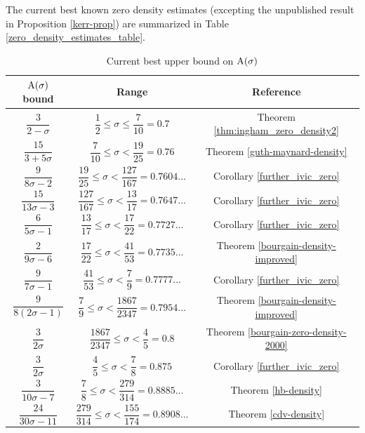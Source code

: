 The current best known zero density estimates (excepting the unpublished result in Proposition \ref{kerr-prop}) are summarized in Table \ref{zero_density_estimates_table}.

\derived
{}

\begin{table}[ht]
    \def\arraystretch{2}
    \centering
    \caption{Current best upper bound on $\mathrm{A}(\sigma)$}
    \begin{tabular}{|c|c|c|}
    \hline
    $\mathrm{A}(\sigma)$ bound & Range & Reference\\
    \hline
    $\dfrac{3}{2 - \sigma}$ & $\dfrac{1}{2} \leq \sigma \le \dfrac{7}{10} = 0.7$ & Theorem \ref{thm:ingham_zero_density2}\\
    \hline
    $\dfrac{15}{3+5\sigma}$ & $\dfrac{7}{10} \leq \sigma < \dfrac{19}{25} = 0.76$ & Theorem \ref{guth-maynard-density}\\
    \hline
    $\dfrac{9}{8\sigma - 2}$ & $\dfrac{19}{25} \leq \sigma < \dfrac{127}{167} = 0.7604\ldots$ & Corollary \ref{further_ivic_zero}\\
    \hline
    $\dfrac{15}{13\sigma - 3}$ & $\dfrac{127}{167} \leq \sigma < \dfrac{13}{17} = 0.7647\ldots$ & Corollary \ref{further_ivic_zero}\\
    \hline
    $\dfrac{6}{5\sigma - 1}$ & $\dfrac{13}{17} \leq \sigma < \dfrac{17}{22} = 0.7727\ldots$ & Corollary \ref{further_ivic_zero}\\
    \hline
    $\dfrac{2}{9\sigma - 6}$ & $\dfrac{17}{22} \leq \sigma < \dfrac{41}{53} = 0.7735\ldots$ & Theorem \ref{bourgain-density-improved}\\
    \hline
    $\dfrac{9}{7\sigma - 1}$ & $\dfrac{41}{53} \leq \sigma < \dfrac{7}{9} = 0.7777\ldots$ & Corollary \ref{further_ivic_zero}\\
    \hline
    $\dfrac{9}{8(2\sigma-1)}$ & $\dfrac{7}{9} \le \sigma < \dfrac{1867}{2347} = 0.7954\ldots$ & Theorem \ref{bourgain-density-improved} \\
    \hline
    $\dfrac{3}{2\sigma}$ & $\dfrac{1867}{2347} \le \sigma < \dfrac{4}{5} = 0.8$ & Theorem \ref{bourgain-zero-density-2000} \\
    \hline
    $\dfrac{3}{2\sigma}$ & $\dfrac{4}{5} \le \sigma < \dfrac{7}{8} = 0.875$ & Corollary \ref{further_ivic_zero} \\
    \hline
    $\dfrac{3}{10\sigma - 7}$ & $\dfrac{7}{8} \le \sigma < \dfrac{279}{314} = 0.8885\ldots$ & Theorem \ref{hb-density}\\
    \hline
    $\dfrac{24}{30\sigma - 11}$ & $\dfrac{279}{314} \le \sigma < \dfrac{155}{174} = 0.8908\ldots$ & Theorem \ref{cdv-density}  \\

\end{tabular}
\end{table}
